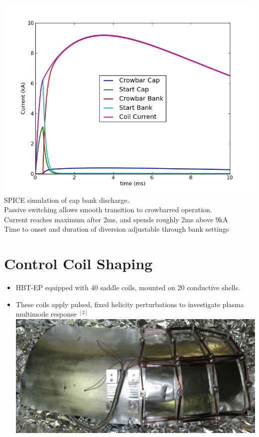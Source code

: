 \documentclass{article}
\begin{document}
\begin{multicols}{5}
\begin{itemize}
\begin{center}
\includegraphics[width=0.9\columnwidth]{bank_currents}
SPICE simulation of cap bank discharge.\\
Passive switching allows smooth transition to crowbarred operation.\\
Current reaches maximum after 2ms, and spends roughly 2ms above 9kA\\
Time to onset and duration of diversion adjustable through bank settings
\end{center}

\end{itemize}

\section{Control Coil Shaping}
\begin{itemize}

\item HBT-EP equipped with 40 saddle coils, mounted on 20 conductive shells. 
\item These coils apply pulsed, fixed helicity perturbations to investigate plasma multimode response $^{[2]}$\\

\includegraphics[width=0.9\columnwidth]{control_shell}\\


\end{itemize}
\end{multicols}
\end{document}
